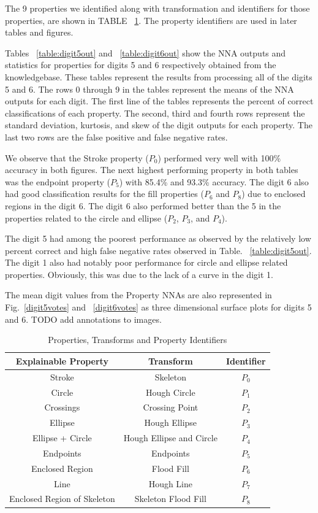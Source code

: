 \documentclass[conference]{IEEEtran}
\begin{document}
The 9 properties we identified along with transformation and identifiers for those properties, are shown in TABLE ~\ref{table:tblproptrans}.  The property identifiers are used in later tables and figures.

Tables ~\ref{table:digit5out} and ~\ref{table:digit6out} show the NNA outputs and statistics for properties for digits 5 and 6 respectively obtained from the knowledgebase.  These tables represent the results from processing all of the digits 5 and 6.   The rows 0 through 9 in the tables represent the means of the NNA outputs for each digit.  The first line of the tables represents the percent of correct classifications of each property.  The second, third and fourth rows represent the standard deviation, kurtosis, and skew of the digit outputs for each property.  The last two rows are the false positive and false negative rates.

We observe that the Stroke property ($P_0$) performed very well with 100\% accuracy in both figures.  The next highest performing property in both tables was the endpoint property ($P_5$) with 85.4\% and 93.3\% accuracy.  The digit 6 also had good classification results for the fill properties ($P_6$ and $P_8$) due to enclosed regions in the digit 6.  The digit 6 also performed better than the 5 in the properties related to the circle and ellipse ($P_2$, $P_3$, and $P_4$).

The digit 5 had among the poorest performance as observed by the relatively low percent correct and high false negative rates observed in Table. ~\ref{table:digit5out}.  The digit 1 also had notably poor performance for circle and ellipse related properties.  Obviously, this was due to the lack of a curve in the digit 1.

The mean digit values from the Property NNAs are also represented  in Fig.~\ref{digit5votes} and ~\ref{digit6votes} as three dimensional surface plots for digits 5 and 6.  TODO add annotations to images.

\begin{table}[htbp]
\caption{Properties, Transforms and Property Identifiers}
\centering
\begin{tabular}{| c | c | c |}
\hline
 Explainable Property & Transform & Identifier \\
\hline\hline
Stroke & Skeleton & $P_0$ \\
\hline
Circle & Hough Circle & $P_1$ \\
\hline
Crossings & Crossing Point & $P_2$ \\
\hline
Ellipse & Hough Ellipse & $P_3$ \\
\hline
Ellipse + Circle & Hough Ellipse and Circle & $P_4$ \\
\hline
Endpoints & Endpoints & $P_5$ \\
\hline
Enclosed Region & Flood Fill & $P_6$ \\
\hline
Line & Hough Line & $P_7$ \\
\hline
Enclosed Region of Skeleton & Skeleton Flood Fill & $P_8$ \\
\hline
\end{tabular}
\label{table:tblproptrans}
\end{table}
\end{document}

